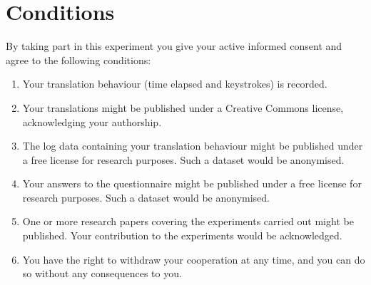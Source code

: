 \documentclass[pdftex,12pt,a4paper]{report} %
\begin{document}
\chapter{Conditions}

By taking part in this experiment you give your active informed consent and agree to the following conditions:

\begin{enumerate}
\item Your translation behaviour (time elapsed and keystrokes) is recorded.
\item Your translations might be published under a Creative Commons license, acknowledging your authorship.
\item The log data containing your translation behaviour might be published under a free license for research purposes. Such a dataset would be anonymised.
\item Your answers to the questionnaire might be published under a free license for research purposes. Such a dataset would be anonymised.
\item One or more research papers covering the experiments carried out might be published. Your contribution to the experiments would be acknowledged.
\item You have the right to withdraw your cooperation at any time, and you can do so without any consequences to you.
\end{enumerate}


%
%
\end{document}
